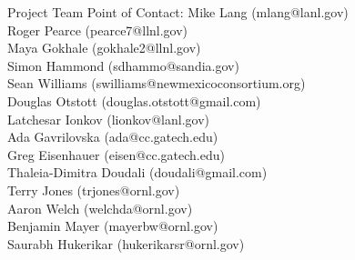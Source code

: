 \documentclass[final,hyperref={pdfpagelabels=false}]{beamer}
\begin{document}
\begin{frame}{}
\begin{columns}[t]
\begin{column}{.45\linewidth}
    \begin{block}{Project Team}
      Point of Contact: Mike Lang (mlang@lanl.gov) \\
      \small
      Roger Pearce (pearce7@llnl.gov) \\
      Maya Gokhale (gokhale2@llnl.gov) \\
      Simon Hammond (sdhammo@sandia.gov) \\
      Sean Williams (swilliams@newmexicoconsortium.org) \\
      Douglas Otstott (douglas.otstott@gmail.com) \\
      Latchesar Ionkov (lionkov@lanl.gov) \\
      Ada Gavrilovska (ada@cc.gatech.edu) \\
      Greg Eisenhauer (eisen@cc.gatech.edu) \\
      Thaleia-Dimitra Doudali (doudali@gmail.com) \\
      Terry Jones (trjones@ornl.gov) \\
      Aaron Welch (welchda@ornl.gov) \\
      Benjamin Mayer (mayerbw@ornl.gov) \\
      Saurabh Hukerikar (hukerikarsr@ornl.gov)
    \end{block}
  \end{column}
  

\end{columns}
\end{frame}
\end{document}
